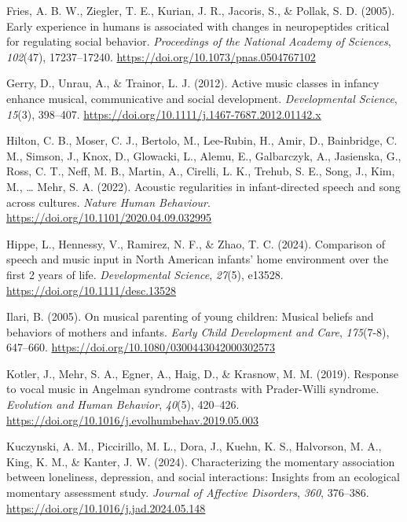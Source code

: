 \documentclass[
]{article}
\newlength{\cslhangindent}
\newenvironment{CSLReferences}[2] %
 {\begin{list}{}{%
  \setlength{\itemindent}{0pt}
  \setlength{\leftmargin}{0pt}
  \setlength{\parsep}{0pt}
  \ifodd #1
   \setlength{\leftmargin}{\cslhangindent}
   \setlength{\itemindent}{-1\cslhangindent}
  \fi
  \setlength{\itemsep}{#2\baselineskip}}}
 {\end{list}}
\begin{document}
\begin{CSLReferences}{1}{0}
Fries, A. B. W., Ziegler, T. E., Kurian, J. R., Jacoris, S., \& Pollak,
S. D. (2005). Early experience in humans is associated with changes in
neuropeptides critical for regulating social behavior. \emph{Proceedings
of the National Academy of Sciences}, \emph{102}(47), 17237--17240.
\url{https://doi.org/10.1073/pnas.0504767102}

Gerry, D., Unrau, A., \& Trainor, L. J. (2012). Active music classes in
infancy enhance musical, communicative and social development.
\emph{Developmental Science}, \emph{15}(3), 398--407.
\url{https://doi.org/10.1111/j.1467-7687.2012.01142.x}

Hilton, C. B., Moser, C. J., Bertolo, M., Lee-Rubin, H., Amir, D.,
Bainbridge, C. M., Simson, J., Knox, D., Glowacki, L., Alemu, E.,
Galbarczyk, A., Jasienska, G., Ross, C. T., Neff, M. B., Martin, A.,
Cirelli, L. K., Trehub, S. E., Song, J., Kim, M., \ldots{} Mehr, S. A.
(2022). Acoustic regularities in infant-directed speech and song across
cultures. \emph{Nature Human Behaviour}.
\url{https://doi.org/10.1101/2020.04.09.032995}

Hippe, L., Hennessy, V., Ramirez, N. F., \& Zhao, T. C. (2024).
Comparison of speech and music input in {North American} infants' home
environment over the first 2 years of life. \emph{Developmental
Science}, \emph{27}(5), e13528. \url{https://doi.org/10.1111/desc.13528}

Ilari, B. (2005). On musical parenting of young children: {Musical}
beliefs and behaviors of mothers and infants. \emph{Early Child
Development and Care}, \emph{175}(7-8), 647--660.
\url{https://doi.org/10.1080/0300443042000302573}

Kotler, J., Mehr, S. A., Egner, A., Haig, D., \& Krasnow, M. M. (2019).
Response to vocal music in {Angelman} syndrome contrasts with
{Prader-Willi} syndrome. \emph{Evolution and Human Behavior},
\emph{40}(5), 420--426.
\url{https://doi.org/10.1016/j.evolhumbehav.2019.05.003}

Kuczynski, A. M., Piccirillo, M. L., Dora, J., Kuehn, K. S., Halvorson,
M. A., King, K. M., \& Kanter, J. W. (2024). Characterizing the
momentary association between loneliness, depression, and social
interactions: {Insights} from an ecological momentary assessment study.
\emph{Journal of Affective Disorders}, \emph{360}, 376--386.
\url{https://doi.org/10.1016/j.jad.2024.05.148}


\end{CSLReferences}
\end{document}
